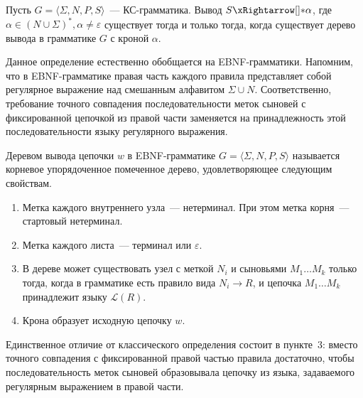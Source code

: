\begin{theorem}
    Пусть $G = \langle \Sigma, N, P, S \rangle$~--- КС-грамматика.
    Вывод $S \derives \alpha$, где $\alpha \in (N \cup \Sigma)^*, \alpha \neq \varepsilon$ существует тогда и только тогда, когда существует дерево вывода в грамматике $G$ с кроной $\alpha$.
\end{theorem}

Данное определение естественно обобщается на EBNF-грамматики.
Напомним, что в EBNF-грамматике правая часть каждого правила представляет собой регулярное выражение над смешанным алфавитом $\Sigma \cup N$.
Соответственно, требование точного совпадения последовательности меток сыновей с фиксированной цепочкой из правой части заменяется на принадлежность этой последовательности языку регулярного выражения.

\begin{definition}
    Деревом вывода цепочки $w$ в EBNF-грамматике $G = \langle \Sigma, N, P, S \rangle$ называется корневое упорядоченное помеченное дерево, удовлетворяющее следующим свойствам.
    \begin{enumerate}
        \item Метка каждого внутреннего узла~--- нетерминал. При этом метка корня~--- стартовый нетерминал.
        \item Метка каждого листа~--- терминал или $\varepsilon$.
        \item В дереве может существовать узел с меткой $N_i$ и сыновьями $M_1 \dots M_k$ только тогда, когда в грамматике есть правило вида $N_i \to R$, и цепочка $M_1 \dots M_k$ принадлежит языку $\mathcal{L}(R)$.
        \item Крона образует исходную цепочку $w$.
    \end{enumerate}
\end{definition}

Единственное отличие от классического определения состоит в пункте~3: вместо точного совпадения с фиксированной правой частью правила достаточно, чтобы последовательность меток сыновей образовывала цепочку из языка, задаваемого регулярным выражением в правой части.

